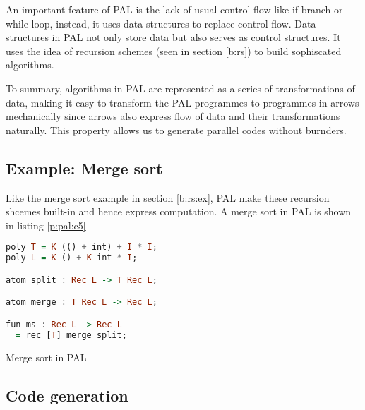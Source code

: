 An important feature of PAL is the lack of usual control flow like if branch or while loop, instead, it uses data structures to replace control flow. Data structures in PAL not only store data but also serves as control structures. It uses the idea of recursion schemes (seen in section \ref{b:rs}) to build sophiscated algorithms. 

To summary, algorithms in PAL are represented as a series of transformations of data, making it easy to transform the PAL programmes to programmes in arrows mechanically since arrows also express flow of data and their transformations naturally. This property allows us to generate parallel codes without burnders.

\subsection{Example: Merge sort}

Like the merge sort example in section \ref{b:rs:ex}, PAL make these recursion shcemes built-in and hence express computation. A merge sort in PAL is shown in listing \ref{p:pal:c5}
\begin{code}
\begin{lstlisting}[language=haskell]
poly T = K (() + int) + I * I;
poly L = K () + K int * I;

atom split : Rec L -> T Rec L;

atom merge : T Rec L -> Rec L;

fun ms : Rec L -> Rec L
  = rec [T] merge split;
\end{lstlisting}
\caption{Merge sort in PAL} \label{p:pal:c5}
\end{code}
\subsection{Code generation}